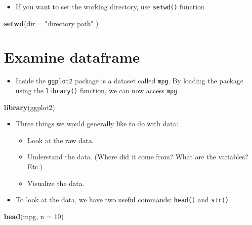 \documentclass[]{book}
\newenvironment{Shaded}{\begin{snugshade}}{\end{snugshade}}
\newcommand{\DataTypeTok}[1]{\textcolor[rgb]{0.13,0.29,0.53}{#1}}
\newcommand{\DecValTok}[1]{\textcolor[rgb]{0.00,0.00,0.81}{#1}}
\newcommand{\KeywordTok}[1]{\textcolor[rgb]{0.13,0.29,0.53}{\textbf{#1}}}
\newcommand{\NormalTok}[1]{#1}
\newcommand{\StringTok}[1]{\textcolor[rgb]{0.31,0.60,0.02}{#1}}
\providecommand{\tightlist}{%
  \setlength{\itemsep}{0pt}\setlength{\parskip}{0pt}}
\begin{document}
\begin{itemize}
\tightlist
\item
  If you want to set the working directory, use \texttt{setwd()} function
\end{itemize}

\begin{Shaded}
\begin{Highlighting}[]
\KeywordTok{setwd}\NormalTok{(}\DataTypeTok{dir =} \StringTok{"directory path"}\NormalTok{ )}
\end{Highlighting}
\end{Shaded}

\hypertarget{examine-dataframe}{%
\section{Examine dataframe}\label{examine-dataframe}}

\begin{itemize}
\tightlist
\item
  Inside the \texttt{ggplot2} package is a dataset called \texttt{mpg}. By loading the package using the \texttt{library()} function, we can now access \texttt{mpg}.
\end{itemize}

\begin{Shaded}
\begin{Highlighting}[]
\KeywordTok{library}\NormalTok{(ggplot2)}
\end{Highlighting}
\end{Shaded}

\begin{itemize}
\tightlist
\item
  Three things we would generally like to do with data:

  \begin{itemize}
  \tightlist
  \item
    Look at the raw data.
  \item
    Understand the data. (Where did it come from? What are the variables? Etc.)
  \item
    Visualize the data.
  \end{itemize}
\item
  To look at the data, we have two useful commands: \texttt{head()} and \texttt{str()}
\end{itemize}

\begin{Shaded}
\begin{Highlighting}[]
\KeywordTok{head}\NormalTok{(mpg, }\DataTypeTok{n =} \DecValTok{10}\NormalTok{)}
\end{Highlighting}
\end{Shaded}
\end{document}
